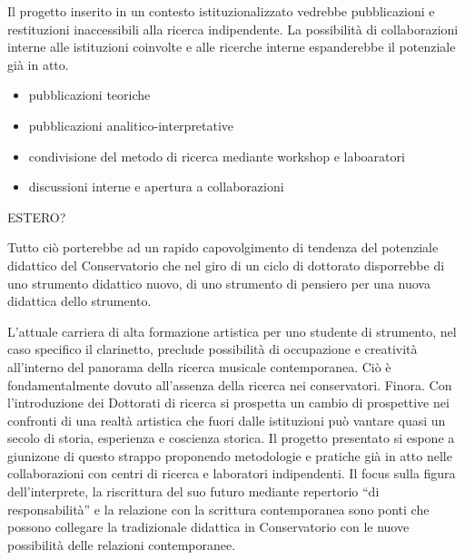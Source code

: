\documentclass{gs-adonis}
\begin{document}
Il progetto inserito in un contesto istituzionalizzato vedrebbe pubblicazioni
e restituzioni inaccessibili alla ricerca indipendente. La possibilità di
collaborazioni interne alle istituzioni coinvolte e alle ricerche interne
espanderebbe il potenziale già in atto.


\begin{itemize}
  \item pubblicazioni teoriche
  \item pubblicazioni analitico-interpretative
  \item condivisione del metodo di ricerca mediante workshop e laboaratori
  \item discussioni interne e apertura a collaborazioni
\end{itemize}

ESTERO?

Tutto ciò porterebbe ad un rapido capovolgimento di tendenza del potenziale
didattico del Conservatorio che nel giro di un ciclo di dottorato disporrebbe
di uno strumento didattico nuovo, di uno strumento di pensiero per una nuova
didattica dello strumento.


L'attuale carriera di alta formazione artistica per uno studente di strumento,
nel caso specifico il clarinetto, preclude possibilità di occupazione e
creatività all'interno del panorama della ricerca musicale contemporanea. Ciò
è fondamentalmente dovuto all'assenza della ricerca nei conservatori. Finora.
Con l'introduzione dei Dottorati di ricerca si prospetta un cambio di
prospettive nei confronti di una realtà artistica che fuori dalle istituzioni
può vantare quasi un secolo di storia, esperienza e coscienza storica. Il
progetto presentato si espone a giunizone di questo strappo proponendo
metodologie e pratiche già in atto nelle collaborazioni con centri di ricerca e
laboratori indipendenti. Il focus sulla figura dell'interprete, la riscrittura
del suo futuro mediante repertorio “di responsabilità” e la relazione con
la scrittura contemporanea sono ponti che possono collegare la tradizionale
didattica in Conservatorio con le nuove possibilità delle relazioni
contemporanee.

\clearpage
\raggedright
\nocite{*}
%
\printbibliography
\end{document}
